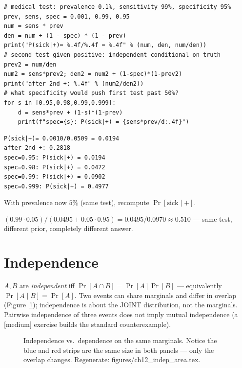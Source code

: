 \begin{lstlisting}[caption={\ttfamily code/ch12\_bayes.py --- Bayes'
theorem with real arithmetic plus the what-if rows.}]
# medical test: prevalence 0.1%, sensitivity 99%, specificity 95%
prev, sens, spec = 0.001, 0.99, 0.95
num = sens * prev
den = num + (1 - spec) * (1 - prev)
print("P(sick|+)= %.4f/%.4f = %.4f" % (num, den, num/den))
# second test given positive: independent conditional on truth
prev2 = num/den
num2 = sens*prev2; den2 = num2 + (1-spec)*(1-prev2)
print("after 2nd +: %.4f" % (num2/den2))
# what specificity would push first test past 50%?
for s in [0.95,0.98,0.99,0.999]:
    d = sens*prev + (1-s)*(1-prev)
    print(f"spec={s}: P(sick|+) = {sens*prev/d:.4f}")
\end{lstlisting}

\begin{lstlisting}[caption={Output of the Bayes calculation. Notice the
second independent test jumps the answer to $28\%$ --- and the last row
shows why epidemiology obsesses over specificity, not sensitivity.}]
P(sick|+)= 0.0010/0.0509 = 0.0194
after 2nd +: 0.2818
spec=0.95: P(sick|+) = 0.0194
spec=0.98: P(sick|+) = 0.0472
spec=0.99: P(sick|+) = 0.0902
spec=0.999: P(sick|+) = 0.4977
\end{lstlisting}

\begin{exercise}[easy]
With prevalence now $5\%$ (same test), recompute $\Pr[\text{sick}\mid+]$.
\begin{solution}
$(0.99\cdot0.05)/(0.0495+0.05\cdot0.95)=0.0495/0.0970\approx0.510$ ---
same test, different prior, completely different answer.
\end{solution}
\end{exercise}

\section{Independence}\label{sec:prob-indep}

$A,B$ are \emph{independent} iff
$\Pr[A\cap B]=\Pr[A]\Pr[B]$ --- equivalently $\Pr[A\mid B]=\Pr[A]$. Two
events can share marginals and differ in overlap
(Figure~\ref{fig:indeparea}); independence is about the JOINT
distribution, not the marginals. Pairwise independence of three events
does not imply mutual independence (a [medium] exercise builds the
standard counterexample).

\begin{figure}[htbp]
\centering

\caption{Independence vs.\ dependence on the same marginals. Notice the
blue and red strips are the same size in both panels --- only the overlap
changes. Regenerate: \ttfamily figures/ch12\_indep\_area.tex.}
\label{fig:indeparea}
\end{figure}

